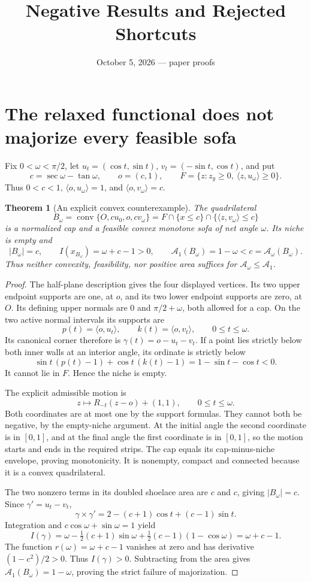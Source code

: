 \documentclass[11pt]{article}
\title{Negative Results and Rejected Shortcuts}
\author{}\date{October 5, 2026 --- paper proofs}
\newtheorem{theorem}{Theorem}[section]
\newcommand{\ip}[2]{\langle #1,#2\rangle}
\begin{document}
\maketitle

\section{The relaxed functional does not majorize every feasible sofa}
Fix $0<\omega<\pi/2$, let $u_t=(\cos t,\sin t)$, $v_t=(-\sin t,\cos t)$, and put
\[
 c=\sec\omega-\tan\omega,\qquad o=(c,1),\qquad
 F=\{z:z_y\ge0,\ \ip z{u_\omega}\ge0\}.
\]
Thus $0<c<1$, $\ip o{u_\omega}=1$, and $\ip o{v_\omega}=c$.

\begin{theorem}[An explicit convex counterexample]\label{thm:counterexample}
The quadrilateral
\[
 B_\omega=\operatorname{conv}\{O,c u_0,o,c v_\omega\}
 =F\cap\{x\le c\}\cap\{\ip z{v_\omega}\le c\}
\]
is a normalized cap and a feasible convex monotone sofa of net angle $\omega$. Its niche is empty and
\[
 |B_\omega|=c,\qquad I(x_{B_\omega})=\omega+c-1>0,
 \qquad \mathcal A_1(B_\omega)=1-\omega<c=\mathcal A_\omega(B_\omega).
\]
Thus neither convexity, feasibility, nor positive area suffices for $\mathcal A_\omega\le\mathcal A_1$.
\end{theorem}
\begin{proof}
The half-plane description gives the four displayed vertices. Its two upper endpoint supports are one, at $o$, and its two lower endpoint supports are zero, at $O$. Its defining upper normals are $0$ and $\pi/2+\omega$, both allowed for a cap. On the two active normal intervals its supports are
\[
 p(t)=\ip o{u_t},\qquad k(t)=\ip o{v_t},\qquad0\le t\le\omega.
\]
Its canonical corner therefore is $\gamma(t)=o-u_t-v_t$. If a point lies strictly below both inner walls at an interior angle, its ordinate is strictly below
\[
 \sin t\,(p(t)-1)+\cos t\,(k(t)-1)
 =1-\sin t-\cos t<0.
\]
It cannot lie in $F$. Hence the niche is empty.

The explicit admissible motion is
\[
 z\longmapsto R_{-t}(z-o)+(1,1),\qquad0\le t\le\omega.
\]
Both coordinates are at most one by the support formulas. They cannot both be negative, by the empty-niche argument. At the initial angle the second coordinate is in $[0,1]$, and at the final angle the first coordinate is in $[0,1]$, so the motion starts and ends in the required strips. The cap equals its cap-minus-niche envelope, proving monotonicity. It is nonempty, compact and connected because it is a convex quadrilateral.

The two nonzero terms in its doubled shoelace area are $c$ and $c$, giving $|B_\omega|=c$. Since $\gamma'=u_t-v_t$,
\[
 \gamma\times\gamma'=2-(c+1)\cos t+(c-1)\sin t.
\]
Integration and $c\cos\omega+\sin\omega=1$ yield
\[
 I(\gamma)=\omega-\tfrac12(c+1)\sin\omega
              +\tfrac12(c-1)(1-\cos\omega)=\omega+c-1.
\]
The function $r(\omega)=\omega+c-1$ vanishes at zero and has derivative $(1-c^2)/2>0$. Thus $I(\gamma)>0$. Subtracting from the area gives $\mathcal A_1(B_\omega)=1-\omega$, proving the strict failure of majorization.
\end{proof}
\end{document}
